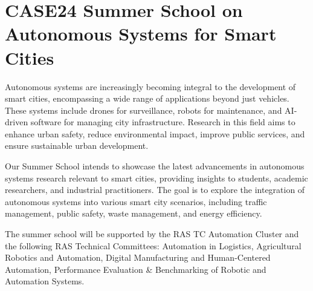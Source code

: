 \documentclass[
	openany, %
	parskip=full, %
	12pt, %
	a4paper, %
]{conferencebooklet} %
\begin{document}
\section{CASE24 Summer School on Autonomous Systems for Smart Cities}

Autonomous systems are increasingly becoming integral to the development of smart cities, encompassing a wide range of applications beyond just vehicles. These systems include drones for surveillance, robots for maintenance, and AI-driven software for managing city infrastructure. Research in this field aims to enhance urban safety, reduce environmental impact, improve public services, and ensure sustainable urban development.

Our Summer School intends to showcase the latest advancements in autonomous systems research relevant to smart cities, providing insights to students, academic researchers, and industrial practitioners. The goal is to explore the integration of autonomous systems into various smart city scenarios, including traffic management, public safety, waste management, and energy efficiency.

The summer school will be supported by the RAS TC Automation Cluster and the following RAS Technical Committees: Automation in Logistics, Agricultural Robotics and Automation, Digital Manufacturing and Human-Centered Automation, Performance Evaluation \& Benchmarking of Robotic and Automation Systems.

\begin{table}[h!]
     \hspace{5mm}
\end{table}
\end{document}
